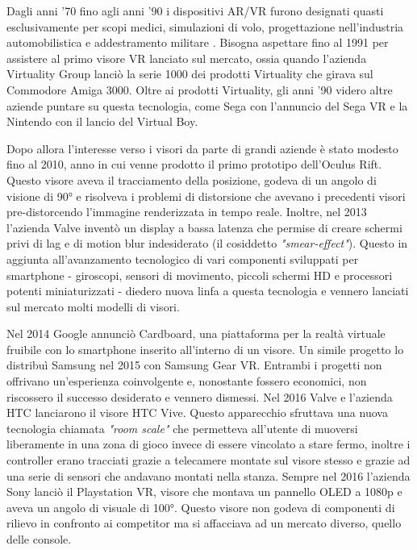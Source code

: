         Dagli anni '70 fino agli anni '90 i dispositivi AR/VR furono designati quasti esclusivamente per scopi medici, simulazioni di volo, progettazione nell'industria automobilistica e addestramento militare \cite{70and90VR}.
        Bisogna aspettare fino al 1991 per assistere al primo visore VR lanciato sul mercato, ossia quando l'azienda Virtuality Group lanciò la serie 1000 dei prodotti Virtuality che girava sul Commodore Amiga 3000.
        Oltre ai prodotti Virtuality, gli anni '90 videro altre aziende puntare su questa tecnologia, come Sega con l'annuncio del Sega VR e la Nintendo con il lancio del Virtual Boy.

        Dopo allora l'interesse verso i visori da parte di grandi aziende è stato modesto fino al 2010, anno in cui venne prodotto il primo prototipo dell'Oculus Rift.
        Questo visore aveva il tracciamento della posizione, godeva di un angolo di visione di 90° e risolveva i problemi di distorsione che avevano i precedenti visori pre-distorcendo l'immagine renderizzata in tempo reale.
        Inoltre, nel 2013 l'azienda Valve inventò un display a bassa latenza che permise di creare schermi privi di lag e di motion blur indesiderato (il cosiddetto \textit{"smear-effect"}).
        Questo in aggiunta all'avanzamento tecnologico di vari componenti sviluppati per smartphone - giroscopi, sensori di movimento, piccoli schermi HD e processori potenti miniaturizzati - diedero nuova linfa a questa tecnologia e vennero lanciati sul mercato molti modelli di visori.

        
        Nel 2014 Google annunciò Cardboard, una piattaforma per la realtà virtuale fruibile con lo smartphone inserito all'interno di un visore.
        Un simile progetto lo distribuì Samsung nel 2015 con Samsung Gear VR.
        Entrambi i progetti non offrivano un'esperienza coinvolgente e, nonostante fossero economici, non riscossero il successo desiderato e vennero dismessi. 
        Nel 2016 Valve e l'azienda HTC lanciarono il visore HTC Vive.
        Questo apparecchio sfruttava una nuova tecnologia chiamata \textit{"room scale"} che permetteva all'utente di muoversi liberamente in una zona di gioco invece di essere vincolato a stare fermo, inoltre i controller erano tracciati grazie a telecamere montate sul visore stesso e grazie ad una serie di sensori che andavano montati nella stanza.
        Sempre nel 2016 l'azienda Sony lanciò il Playstation VR, visore che montava un pannello OLED a 1080p e aveva un angolo di visuale di 100°.
        Questo visore non godeva di componenti di rilievo in confronto ai competitor ma si affacciava ad un mercato diverso, quello delle console.

